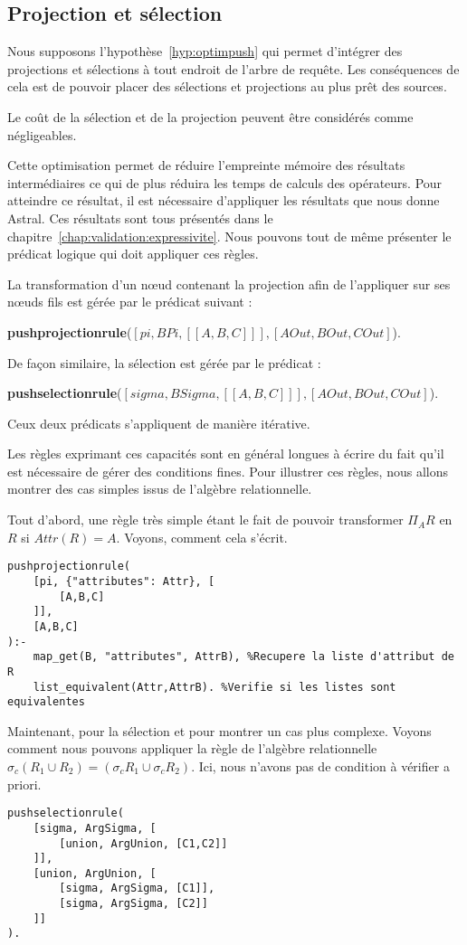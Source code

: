 \subsection{Projection et sélection}
Nous supposons l'hypothèse~\ref{hyp:optimpush} qui permet d'intégrer des projections et sélections à tout endroit de l'arbre de requête. Les conséquences de cela est de pouvoir placer des sélections et projections au plus prêt des sources. 
\begin{hyp}\label{hyp:optimpush}
    Le coût de la sélection et de la projection peuvent être considérés comme négligeables.
\end{hyp}
Cette optimisation permet de réduire l'empreinte mémoire des résultats intermédiaires ce qui de plus réduira les temps de calculs des opérateurs. Pour atteindre ce résultat, il est nécessaire d'appliquer les résultats que nous donne Astral. Ces résultats sont tous présentés dans le chapitre~\ref{chap:validation:expressivite}. Nous pouvons tout de même présenter le prédicat logique qui doit appliquer ces règles.
\begin{regle}
La transformation d'un nœud contenant la projection afin de l'appliquer sur ses nœuds fils est gérée par le prédicat suivant :
\begin{center} \textbf{pushprojectionrule}($[pi,BPi,[[A,B,C]]],[AOut,BOut,COut]$).\end{center}
De façon similaire, la sélection est gérée par le prédicat :
\begin{center} \textbf{pushselectionrule}($[sigma,BSigma,[[A,B,C]]],[AOut,BOut,COut]$).\end{center}
Ceux deux prédicats s'appliquent de manière itérative.
\end{regle}

Les règles exprimant ces capacités sont en général longues à écrire du fait qu'il est nécessaire de gérer des conditions fines. Pour illustrer ces règles, nous allons montrer des cas simples issus de l'algèbre relationnelle.
\begin{example}
	Tout d'abord, une règle très simple étant le fait de pouvoir transformer $\Pi_A R$ en $R$ si $Attr(R)=A$. Voyons, comment cela s'écrit.
	\begin{lstlisting}
pushprojectionrule(
    [pi, {"attributes": Attr}, [
        [A,B,C]
    ]],
    [A,B,C]
):-
    map_get(B, "attributes", AttrB), %Recupere la liste d'attribut de R
    list_equivalent(Attr,AttrB). %Verifie si les listes sont equivalentes
	\end{lstlisting}
	
	Maintenant, pour la sélection et pour montrer un cas plus complexe. Voyons comment nous pouvons appliquer la règle de l'algèbre relationnelle $\sigma_c (R_1 \cup R_2) = (\sigma_c R_1 \cup \sigma_c R_2)$. Ici, nous n'avons pas de condition à vérifier a priori.
	\begin{lstlisting}
pushselectionrule(
    [sigma, ArgSigma, [
        [union, ArgUnion, [C1,C2]]
    ]],
    [union, ArgUnion, [
        [sigma, ArgSigma, [C1]], 
        [sigma, ArgSigma, [C2]]
    ]]
).
	\end{lstlisting}
\end{example}

